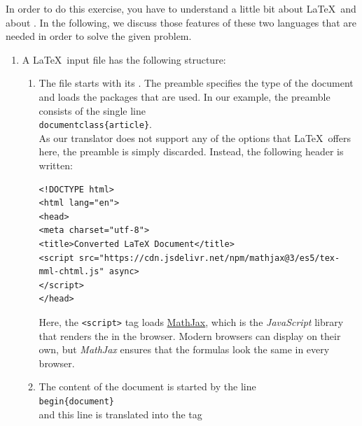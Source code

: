 In order to do this exercise, you have to understand a little bit about \LaTeX\ and about 
.  In the following, we discuss those features of these two languages that are needed in order to
solve the given problem.
\begin{enumerate}
\item A \LaTeX\ input file has the following structure:
      \begin{enumerate}
      \item The file starts with its .  The preamble specifies the type of the
            document and loads the packages that are used.  In our example, the preamble consists of the single
            line
            \\[0.2cm]
            \hspace*{1.3cm}
            \texttt{documentclass\{article\}}.
            \\[0.2cm]
            As our translator does not support any of the options that \LaTeX\ offers here, the preamble is
            simply discarded.  Instead, the following  header is written:
\begin{verbatim}
<!DOCTYPE html>
<html lang="en">
<head>
<meta charset="utf-8">
<title>Converted LaTeX Document</title>
<script src="https://cdn.jsdelivr.net/npm/mathjax@3/es5/tex-mml-chtml.js" async>
</script>
</head>
\end{verbatim}
            Here, the \texttt{<script>} tag loads \href{https://www.mathjax.org}{MathJax}, which is the
            \textsl{JavaScript} library that renders the  in the browser.  Modern browsers
            can display  on their own, but \textsl{MathJax} ensures that the formulas look
            the same in every browser.
      \item The content of the document is started by the line
            \\[0.2cm]
            \hspace*{1.3cm}
            \texttt{begin\{document\}}
            \\[0.2cm]
            and this line is translated into the tag
            \\[0.2cm]
            \hspace*{1.3cm}

\end{enumerate}
\end{enumerate}
